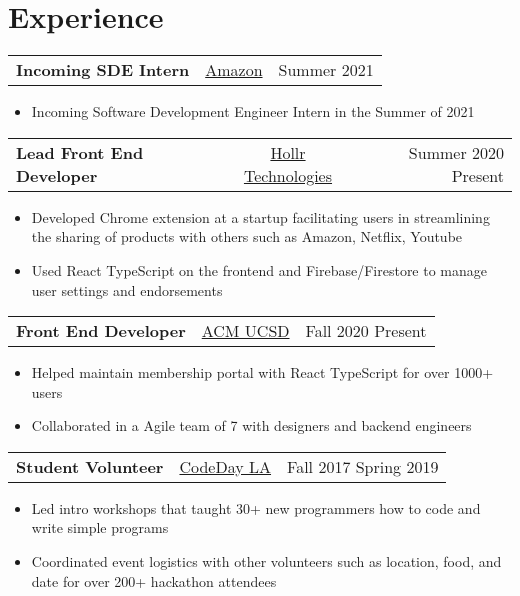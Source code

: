 \documentclass{article}
\begin{document}
\section*{Experience}
\begin{tabularx}{\textwidth}{L C R}
  \textbf{Incoming SDE Intern} & \href{https://www.amazonuniversity.jobs/}{Amazon} & Summer 2021
\end{tabularx}
\begin{itemize}
  \setlength{\itemsep}{-2pt}
  \item Incoming Software Development Engineer Intern in the Summer of 2021
\end{itemize}
\begin{tabularx}{\textwidth}{L C R}
  \textbf{Lead Front End Developer} & \href{https://www.joinhollr.com}{{Hollr Technologies}} & Summer 2020 \textendash{} Present
\end{tabularx}
\begin{itemize}
  \setlength{\itemsep}{-2pt}
  \item Developed Chrome extension at a startup facilitating users in streamlining the sharing of products with others such as Amazon, Netflix, Youtube
  \item Used React TypeScript on the frontend and Firebase/Firestore to manage user settings and endorsements
\end{itemize}
\begin{tabularx}{\textwidth}{L C R}
  \textbf{Front End Developer} & \href{https://acmucsd.com}{{ACM UCSD}} & Fall 2020 \textendash{} Present
\end{tabularx}
\begin{itemize}
  \setlength{\itemsep}{-2pt}
  \item Helped maintain membership portal with React TypeScript for over 1000+ users
  \item Collaborated in a Agile team of 7 with designers and backend engineers
\end{itemize}
\begin{tabularx}{\textwidth}{L C R}
  \textbf{Student Volunteer} & \href{https://www.codeday.org/}{{CodeDay LA}} & Fall 2017 \textendash{} Spring 2019
\end{tabularx}
\begin{itemize}
  \setlength{\itemsep}{-2pt}
  \item Led intro workshops that taught 30+ new programmers how to code and write simple programs
  \item Coordinated event logistics with other volunteers such as location, food, and date for over 200+ hackathon attendees
\end{itemize}
\end{document}
